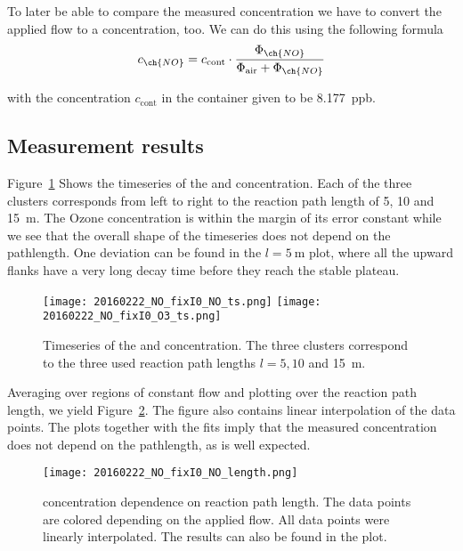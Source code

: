 To later be able to compare the measured  concentration we have
to convert the applied  flow to a concentration, too. We can
do this using the following formula
\begin{align*}
  c_{\ch{NO}} = c_{\text{cont}} \cdot \frac{\Phi_{\ch{NO}}}{\Phi_{\text{air}} + \Phi_{\ch{NO}}}
\end{align*}

with the concentration $c_{\text{cont}}$ in the  container
given to be \SI{8.177}{ppb}. 

\subsection{Measurement results}
\label{sec:no-result}

Figure~\ref{fig:ts} Shows the timeseries of the  and 
concentration. Each of the three clusters corresponds from left to
right to the reaction path length of \num{5}, \num{10} and
\SI{15}{\meter}. The Ozone concentration is within the margin of its
error constant while we see that the overall shape of the 
timeseries does not depend on the pathlength. One deviation can be
found in the $l = \SI{5}{\meter}$ plot, where all the upward flanks
have a very long decay time before they reach the stable plateau.

\begin{figure}[htbp]
  \centering
  \texttt{[image: 20160222\_NO\_fixI0\_NO\_ts.png]}
  \hfill
  \texttt{[image: 20160222\_NO\_fixI0\_O3\_ts.png]}
  \caption{Timeseries of the  and  concentration. The
    three clusters correspond to the three used reaction path lengths
    $l = 5, 10$ and \SI{15}{\meter}.}
  \label{fig:ts}
\end{figure}

Averaging over regions of constant flow and plotting over the reaction
path length, we yield Figure~\ref{fig:no-length}. The figure also
contains linear interpolation of the data points. The plots together
with the fits imply that the measured  concentration does not
depend on the pathlength, as is well expected.

\begin{figure}[htbp]
  \centering
  \texttt{[image: 20160222\_NO\_fixI0\_NO\_length.png]}
  \caption{ concentration dependence on reaction path
    length. The data points are colored depending on the applied
     flow. All data points were linearly interpolated. The
    results can also be found in the plot.}
  \label{fig:no-length}
\end{figure}

